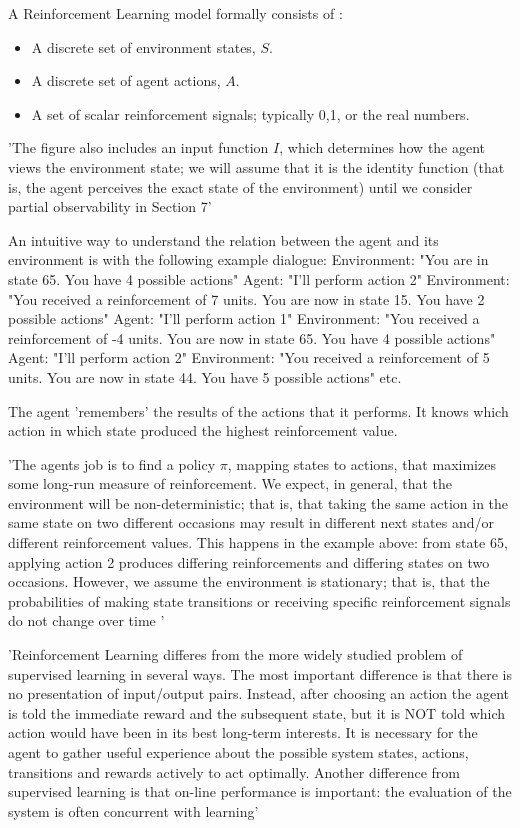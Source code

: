 A Reinforcement Learning model formally consists of \cite{KaelblingLittmanMoore1996}:
\begin{itemize}
	\item A discrete set of environment states, $S$.
	\item A discrete set of agent actions, $A$.
	\item A set of scalar reinforcement signals; typically {0,1}, or the real numbers.
\end{itemize}

'The figure also includes an input function $I$, which determines how the agent views the environment state; we will assume that it is the identity function (that is, the agent perceives the exact state of the environment) until we consider partial observability in Section 7' \cite{KaelblingLittmanMoore1996}

An intuitive way to understand the relation between the agent and its environment is with the following example dialogue:
Environment: "You are in state 65. You have 4 possible actions"
Agent: "I'll perform action 2"
Environment: "You received a reinforcement of 7 units. You are now in state 15. You have 2 possible actions"
Agent: "I'll perform action 1"
Environment: "You received a reinforcement of -4 units. You are now in state 65. You have 4 possible actions"
Agent: "I'll perform action 2"
Environment: "You received a reinforcement of 5 units. You are now in state 44. You have 5 possible actions"
etc.

The agent 'remembers' the results of the actions that it performs. It knows which action in which state produced the highest reinforcement value.

'The agents job is to find a policy $\pi$, mapping states to actions, that maximizes some long-run measure of reinforcement. We expect, in general, that the environment will be non-deterministic; that is, that taking the same action in the same state on two different occasions may result in different next states and/or different reinforcement values. This happens in the example above: from state 65, applying action 2 produces differing reinforcements and differing states on two occasions. However, we assume the environment is stationary; that is, that the probabilities of making state transitions or receiving specific reinforcement signals do not change over time ' \cite{KaelblingLittmanMoore1996}

'Reinforcement Learning differes from the more widely studied problem of supervised learning in several ways. The most important difference is that there is no presentation of input/output pairs. Instead, after choosing an action the agent is told the immediate reward and the subsequent state, but it is NOT told which action would have been in its best long-term interests. It is necessary for the agent to gather useful experience about the possible system states, actions, transitions and rewards actively to act optimally. Another difference from supervised learning is that on-line performance is important: the evaluation of the system is often concurrent with learning' \cite{KaelblingLittmanMoore1996}

